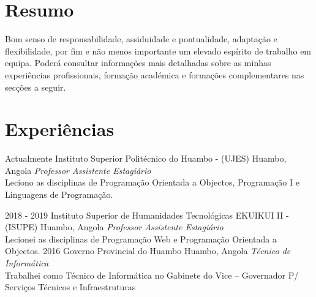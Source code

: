 \divider
\section{Resumo}
  \vspace{-0.2cm}
  
  
  
  Bom senso de responsabilidade, assiduidade e pontualidade, adaptação e flexibilidade, por fim e não menos importante um elevado espírito de trabalho em equipa. Poderá consultar informações mais detalhadas sobre as minhas experiências profissionais, formação académica e formações complementares nas secções a seguir.\\
  \divider

\section{Experiências}

\begin{entrada}

\lista
  {Actualmente}
  {Instituto Superior Politécnico do Huambo - (UJES)}
  {Huambo, Angola}
  {\textsf{\emph{Professor Assistente Estagiário}}\\
  \small{Leciono as disciplinas de Programação Orientada a Objectos}, Programação I e Linguagens de Programação.}

\lista
  {2018 - 2019}
  {Instituto Superior de Humanidades Tecnológicas EKUIKUI II - (ISUPE)}
  {Huambo, Angola}
  {\textsf{\emph{Professor Assistente Estagiário}}\\
  \small{Lecionei as disciplinas de Programação Web e Programação Orientada a Objectos.}}
\lista
  {2016}
  {Governo Provincial do Huambo}
  {Huambo, Angola}
  {\textsf{\emph{Técnico de Informática}}\\
  \small{Trabalhei como Técnico de Informática no Gabinete do Vice – Governador P/ Serviços Técnicos e Infraestruturas}}



\end{entrada}

